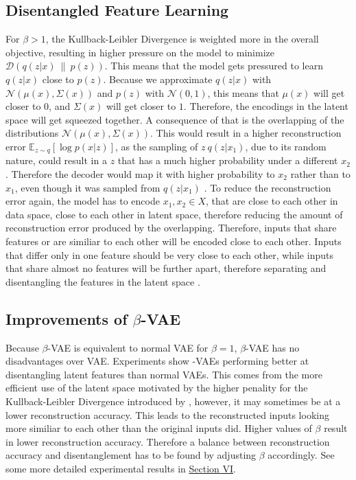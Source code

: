 \documentclass[a4paper]{IEEEtran}
\begin{document}
\subsection{Disentangled Feature Learning}
For $\beta > 1$, the Kullback-Leibler Divergence is weighted more in the overall objective, resulting in higher pressure on the model to minimize $\mathcal{D}(q(z|x) \ \| \ p(z))$. This means that the model gets pressured to learn $q(z|x)$ close to $p(z)$. Because we approximate $q(z|x)$ with $\mathcal{N}(\mu(x), \Sigma(x))$ and $p(z)$ with $\mathcal{N}(0, 1)$, this means that $\mu(x)$ will get closer to $0$, and $\Sigma(x)$ will get closer to $1$. Therefore, the encodings in the latent space will get squeezed together. A consequence of that is the overlapping of the distributions $\mathcal{N}(\mu(x), \Sigma(x))$. This would result in a higher reconstruction error $\mathbb{E}_{z \sim q}\left[ \log p(x|z) \right]$, as the sampling of $z ~ q(z|x_1)$, due to its random nature, could result in a $z$ that has a much higher probability under a different $x_2$. Therefore the decoder would map it with higher probability to $x_2$ rather than to $x_1$, even though it was sampled from $q(z|x_1)$ \cite{burgess2018understanding}. To reduce the reconstruction error again, the model has to encode $x_1, x_2 \in X$, that are close to each other in data space, close to each other in latent space, therefore reducing the amount of reconstruction error produced by the overlapping. Therefore, inputs that share features or are similiar to each other will be encoded close to each other. Inputs that differ only in one feature should be very close to each other, while inputs that share almost no features will be further apart, therefore separating and disentangling the features in the latent space \cite{burgess2018understanding}.


\subsection{Improvements of $\beta$-VAE}
Because $\beta$-VAE is equivalent to normal VAE for $\beta = 1$, $\beta$-VAE has no disadvantages over VAE. Experiments show \textbeta -VAEs performing better at disentangling latent features than normal VAEs. This comes from the more efficient use of the latent space motivated by the higher penality for the Kullback-Leibler Divergence introduced by \textbeta, however, it may sometimes be at a lower reconstruction accuracy. This leads to the reconstructed inputs looking more similiar to each other than the original inputs did. Higher values of $\beta$ result in lower reconstruction accuracy. Therefore a balance between reconstruction accuracy and disentanglement has to be found by adjusting $\beta$ accordingly. See some more detailed experimental results in \hyperref[sec:experiments]{Section VI}.
\end{document}
